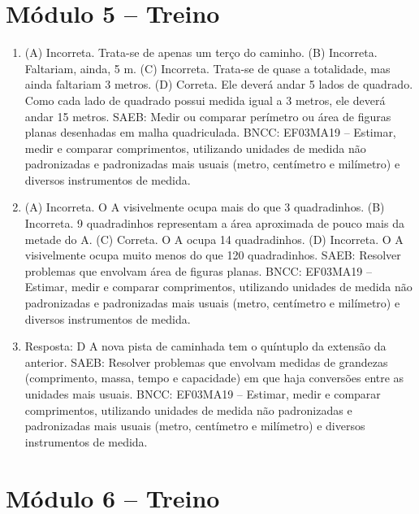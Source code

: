 \section*{Módulo 5 -- Treino}

\begin{enumerate}
\item
(A) Incorreta. Trata-se de apenas um terço do caminho.
(B) Incorreta. Faltariam, ainda, 5 m.
(C) Incorreta. Trata-se de quase a totalidade, mas ainda faltariam 3 metros.
(D) Correta. Ele deverá andar 5 lados de quadrado. Como cada lado de quadrado possui
medida igual a 3 metros, ele deverá andar 15 metros.
SAEB: Medir ou comparar perímetro ou área de figuras planas desenhadas em malha quadriculada. 
BNCC: EF03MA19 -- Estimar, medir e comparar comprimentos, utilizando unidades de medida
não padronizadas e padronizadas mais usuais (metro, centímetro e milímetro) e diversos
instrumentos de medida.

\item
(A) Incorreta. O A visivelmente ocupa mais do que 3 quadradinhos.
(B) Incorreta. 9 quadradinhos representam a área aproximada de pouco mais da metade do A.
(C) Correta. O A ocupa 14 quadradinhos. 
(D) Incorreta. O A visivelmente ocupa muito menos do que 120 quadradinhos.
SAEB: Resolver problemas que envolvam área de figuras planas. 
BNCC: EF03MA19 -- Estimar, medir e comparar comprimentos, utilizando unidades de medida
não padronizadas e padronizadas mais usuais (metro, centímetro e milímetro) e diversos
instrumentos de medida.

\item
Resposta: D
A nova pista de caminhada tem o quíntuplo da extensão da anterior.
SAEB: Resolver problemas que envolvam medidas de grandezas (comprimento, massa, tempo e capacidade) em que haja conversões entre as unidades mais usuais. 
BNCC: EF03MA19 -- Estimar, medir e comparar comprimentos, utilizando unidades de medida
não padronizadas e padronizadas mais usuais (metro, centímetro e milímetro) e diversos
instrumentos de medida.
\end{enumerate}

\section*{Módulo 6 -- Treino}


